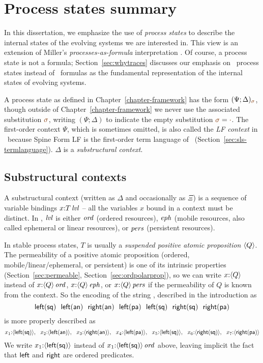\chapter{Process states summary}
\label{appendix-procsum}

In this dissertation, we emphasize the use of {\it process states} to
describe the internal states of the evolving systems we are interested in.
This view is an extension of Miller's {\it processes-as-formula}
interpretation \cite{miller92pi,deng12relating}. Of course, a process
state is not a formula; Section~\ref{sec:whytraces} discusses our
emphasis on \sls~process states instead of \sls~formulas as the fundamental
representation of the internal states of evolving systems.

A process state as defined in Chapter~\ref{chapter-framework} has the
form $(\Psi; \Delta)_{\lf{\sigma}}$, though outside of
Chapter~\ref{chapter-framework} we never use the associated
substitution $\lf{\sigma}$, writing $(\Psi; \Delta)$ to indicate the
empty substitution $\lf{\sigma} = \lf{\cdot}$. The first-order context
$\Psi$, which is sometimes omitted, is also called the {\it LF
  context} in \sls~because Spine Form LF is the first-order term
language of \sls~(Section~\ref{sec:sls-termlanguage}). $\Delta$ is a
{\it substructural context}.

\section{Substructural contexts}

A substructural context (written as $\Delta$ and occasionally as $\Xi$)
is a sequence of variable bindings $x{:}{T}\,{{\it lvl}}$ -- all the
variables $x$ bound in a context must be distinct. In \sls, ${\it lvl}$ is
either ${\it ord}$ (ordered resources), ${\it eph}$ (mobile resources, also
called ephemeral or linear resources), or ${\it pers}$ (persistent
resources). 

In stable process states, $T$ is usually a {\it suspended positive
  atomic proposition} $\langle {Q} \rangle$.  The permeability of a positive
atomic proposition (ordered, mobile/linear/ephemeral, or persistent)
is one of its intrinsic properties (Section~\ref{sec:permeable},
Section~\ref{sec:ordpolarprop}), so we can write $x{:}\langle {Q} \rangle$
instead of $x{:}{\langle {Q} \rangle}\,{{\it ord}}$, $x{:}{\langle {Q} \rangle}\,{{\it eph}}$, or
$x{:}{\langle {Q} \rangle}\,{{\it pers}}$ if the permeability of $Q$ is known from the
context. So the encoding of the string \obj{\mbox{{\sf [
      \textless~\textgreater~( [ ] )}}}, described in the introduction
as
\[
{\sf 
  left(sq) ~~
  left(an) ~~
  right(an) ~~
  left(pa) ~~
  left(sq) ~~
  right(sq) ~~
  right(pa)}
\]
is more properly described as
{\footnotesize \[ 
{
  x_1{:}\langle {\sf left(sq)} \rangle, ~~
  x_2{:}\langle {\sf left(an)} \rangle, ~~
  x_3{:}\langle {\sf right(an)} \rangle, ~~
  x_4{:}\langle {\sf left(pa)} \rangle, ~~
  x_5{:}\langle {\sf left(sq)} \rangle, ~~
  x_6{:}\langle {\sf right(sq)} \rangle, ~~
  x_7{:}\langle {\sf right(pa)} \rangle
}
\]}We write $x_1{:}{\langle {\sf left(sq)} \rangle}$ instead of
$x_1{:}{\langle {\sf left(sq)} \rangle}\,{{\it ord}}$ above, leaving implicit the fact that 
${\sf left}$ and ${\sf right}$ are ordered predicates.


